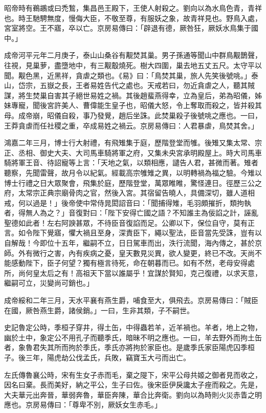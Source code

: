 \begin{pinyinscope}
昭帝時有鵜鶘或曰禿鶖，集昌邑王殿下，王使人射殺之。劉向以為水鳥色青，青祥也。時王馳騁無度，慢侮大臣，不敬至尊，有服妖之象，故青祥見也。野鳥入處，宮室將空。王不寤，卒以亡。京房易傳曰：「辟退有德，厥咎狂，厥妖水鳥集于國中。」

成帝河平元年二月庚子，泰山山桑谷有觏焚其巢。男子孫通等聞山中群鳥觏鵲聲，往視，見巢萝，盡墮地中，有三觏鷇燒死。樹大四圍，巢去地五丈五尺。太守平以聞。觏色黑，近黑祥，貪虐之類也。《易》曰：「鳥焚其巢，旅人先笑後號咷。」泰山，岱宗，五嶽之長，王者易姓告代之處也。天戒若曰，勿近貪虐之人，聽其賊謀，將生焚巢自害其子絕世易姓之禍。其後趙蜚燕得幸，立為皇后，弟為昭儀，姊妹專寵，聞後宮許美人、曹偉能生皇子也，昭儀大怒，令上奪取而殺之，皆并殺其母。成帝崩，昭儀自殺，事乃發覺，趙后坐誅。此焚巢殺子後號咷之應也。一曰，王莽貪虐而任社稷之重，卒成易姓之禍云。京房易傳曰：人君暴虐，鳥焚其舍。」

鴻嘉二年三月，博士行大射禮，有飛雉集于庭，歷階登堂而雊。後雉又集太常、宗正、丞相、御史大夫、大司馬車騎將軍之府，又集未央宮承明殿屋上。時大司馬車騎將軍王音、待詔寵等上言：「天地之氣，以類相應，譴告人君，甚微而著。雉者聽察，先聞雷聲，故月令以紀氣。經載高宗雊雉之異，以明轉禍為福之驗。今雉以博士行禮之日大眾聚會，飛集於庭，歷階登堂，萬眾睢睢，驚怪連日。徑歷三公之府，太常宗正典宗廟骨肉之官，然後入宮。其宿留告曉人，具備深切，雖人道相戒，何以過是！」後帝使中常侍晁閎詔音曰：「聞捕得雉，毛羽頗摧折，類拘執者，得無人為之？」音復對曰：「陛下安得亡國之語？不知誰主為佞諂之計，誣亂聖德如此者！左右阿諛甚眾，不待臣音復諂而足。公卿以下，保位自守，莫有正言。如令陛下覺寤，懼大禍且至身，深責臣下，繩以聖法，臣音當先受誅，豈有以自解哉！今即位十五年，繼嗣不立，日日駕車而出，泆行流聞，海內傳之，甚於京師。外有微行之害，內有疾病之憂，皇天數見災異，欲人變更，終已不改。天尚不能感動陛下，臣子何望？獨有極言待死，命在朝暮而已。如有不然，老母安得處所，尚何皇太后之有！高祖天下當以誰屬乎！宜謀於賢知，克己復禮，以求天意，繼嗣可立，災變尚可銷也。」

成帝綏和二年三月，天水平襄有燕生爵，哺食至大，俱飛去。京房易傳曰：「賊臣在國，厥咎燕生爵，諸侯銷。」一曰，生非其類，子不嗣世。

史記魯定公時，季桓子穿井，得土缶，中得蟲若羊，近羊禍也。羊者，地上之物，幽於土中，象定公不用孔子而聽季氏，暗昧不明之應也。一曰，羊去野外而拘土缶者，象魯君失其所而拘於季氏，季氏亦將拘於家臣也。是歲季氏家臣陽虎囚季桓子。後三年，陽虎劫公伐孟氏，兵敗，竊寶玉大弓而出亡。

左氏傳魯襄公時，宋有生女子赤而毛，棄之隄下，宋平公母共姬之御者見而收之，因名曰棄。長而美好，納之平公，生子曰佐。後宋臣伊戾讒太子痤而殺之。先是，大夫華元出奔晉，華弱奔魯，華臣奔陳，華合比奔衛。劉向以為時則火災赤眚之明應也。京房易傳曰：「尊卑不別，厥妖女生赤毛。」


\end{pinyinscope}
